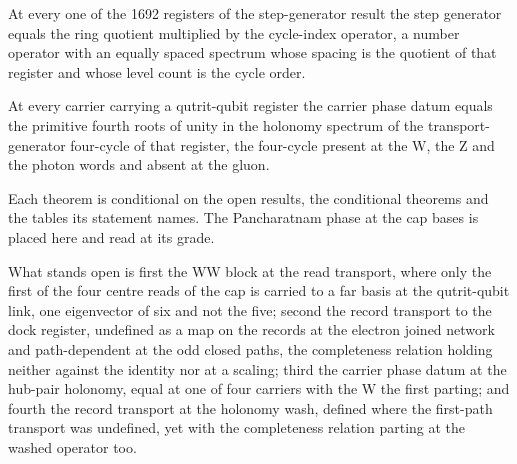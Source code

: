 \begin{chtheorem}\label{box:XIII-6-holonomy-and-the-record-transport:3}
At every one of the 1692 registers of the step-generator result the step generator equals the ring quotient multiplied by the cycle-index operator, a number operator with an equally spaced spectrum whose spacing is the quotient of that register and whose level count is the cycle order.
\end{chtheorem}
\begin{chtheorem}\label{box:XIII-6-holonomy-and-the-record-transport:4}
At every carrier carrying a qutrit-qubit register the carrier phase datum equals the primitive fourth roots of unity in the holonomy spectrum of the transport-generator four-cycle of that register, the four-cycle present at the W, the Z and the photon words and absent at the gluon.
\end{chtheorem}
Each theorem is conditional on the open results, the conditional theorems and the tables its statement names. The Pancharatnam phase at the cap bases is placed here and read at its grade.
\begin{chwall}\label{box:XIII-6-holonomy-and-the-record-transport:5}
What stands open is first the WW block at the read transport, where only the first of the four centre reads of the cap is carried to a far basis at the qutrit-qubit link, one eigenvector of six and not the five; second the record transport to the dock register, undefined as a map on the records at the electron joined network and path-dependent at the odd closed paths, the completeness relation holding neither against the identity nor at a scaling; third the carrier phase datum at the hub-pair holonomy, equal at one of four carriers with the W the first parting; and fourth the record transport at the holonomy wash, defined where the first-path transport was undefined, yet with the completeness relation parting at the washed operator too.
\end{chwall}
